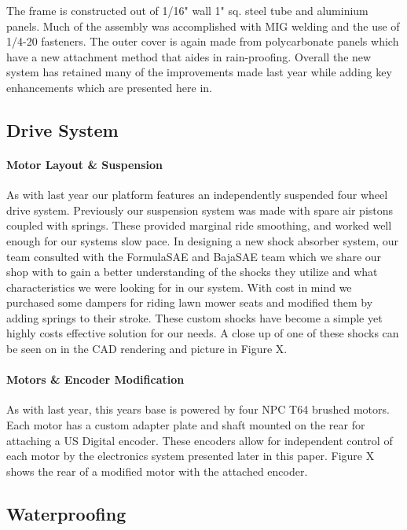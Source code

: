 The frame is constructed out of 1/16" wall 1" sq. steel tube and aluminium panels. Much of the assembly was accomplished with MIG welding and the use of 1/4-20 fasteners. The outer cover is again made from polycarbonate panels which have a new attachment method that aides in rain-proofing. Overall the new system has retained many of the improvements made last year while adding key enhancements which are presented here in. 

\subsection{Drive System}
\paragraph{Motor Layout \& Suspension}
As with last year our platform features an independently suspended four wheel drive system. Previously our suspension system was made with spare air pistons coupled with springs. These provided marginal ride smoothing, and worked well enough for our systems slow pace. In designing a new shock absorber system, our team consulted with the FormulaSAE and BajaSAE team which we share our shop with to gain a better understanding of the shocks they utilize and what characteristics we were looking for in our system. With cost in mind we purchased some dampers for riding lawn mower seats and modified them by adding springs to their stroke. These custom shocks have become a simple yet highly costs effective solution for our needs. A close up of one of these shocks can be seen on in the CAD rendering and picture in Figure X.

\paragraph{Motors \& Encoder Modification}
As with last year, this years base is powered by four NPC T64 brushed motors. Each motor has a custom adapter plate and shaft mounted on the rear for attaching a US Digital encoder. These encoders allow for independent control of each motor by the electronics system presented later in this paper. Figure X shows the rear of a modified motor with the attached encoder.

\subsection{Waterproofing}

